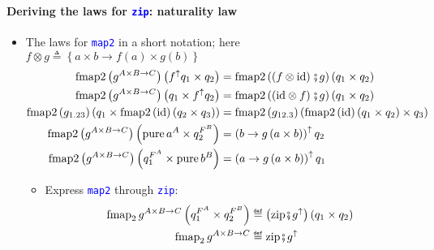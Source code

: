 \paragraph{Deriving the laws for \texttt{\textcolor{blue}{\footnotesize{}zip}}:
naturality law}
\begin{itemize}
\item \vspace{-0.2cm}The laws for \texttt{\textcolor{blue}{\footnotesize{}map2}}
in a short notation; here{\footnotesize{} $f\otimes g\triangleq\left\{ a\times b\rightarrow f(a)\times g(b)\right\} $}
{\footnotesize{}
\begin{align*}
\text{fmap2}\left(g^{A\times B\rightarrow C}\right)\left(f^{\uparrow}q_{1}\times q_{2}\right) & =\text{fmap2}\left(\left(f\otimes\text{id}\right)\bef g\right)\left(q_{1}\times q_{2}\right)\\
\text{fmap2}\left(g^{A\times B\rightarrow C}\right)\left(q_{1}\times f^{\uparrow}q_{2}\right) & =\text{fmap2}\left(\left(\text{id}\otimes f\right)\bef g\right)\left(q_{1}\times q_{2}\right)\\
\text{fmap2}\left(g_{1.23}\right)\left(q_{1}\times\text{fmap2}\left(\text{id}\right)\left(q_{2}\times q_{3}\right)\right) & =\text{fmap2}\left(g_{12.3}\right)\left(\text{fmap2}\left(\text{id}\right)\left(q_{1}\times q_{2}\right)\times q_{3}\right)\\
\text{fmap2}\left(g^{A\times B\rightarrow C}\right)\left(\text{pure}\,a^{A}\times q_{2}^{F^{B}}\right) & =\left(b\rightarrow g\left(a\times b\right)\right)^{\uparrow}q_{2}\\
\text{fmap2}\left(g^{A\times B\rightarrow C}\right)\left(q_{1}^{F^{A}}\times\text{pure}\,b^{B}\right) & =\left(a\rightarrow g\left(a\times b\right)\right)^{\uparrow}q_{1}
\end{align*}
}{\footnotesize\par}
\begin{itemize}
\item Express \texttt{\textcolor{blue}{\footnotesize{}map2}} through \texttt{\textcolor{blue}{\footnotesize{}zip}}:{\footnotesize{}
\begin{align*}
\text{fmap}_{2}\,g^{A\times B\rightarrow C}\left(q_{1}^{F^{A}}\times q_{2}^{F^{B}}\right) & \triangleq\left(\text{zip}\bef g^{\uparrow}\right)\left(q_{1}\times q_{2}\right)\\
\text{fmap}_{2}\,g^{A\times B\rightarrow C} & \triangleq\text{zip}\bef g^{\uparrow}
\end{align*}
}{\footnotesize\par}

\end{itemize}
\end{itemize}
